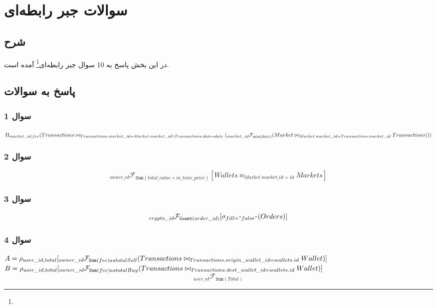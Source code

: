 \documentclass{book}
\begin{document}
        \chapter{سوالات جبر رابطه‌ای}
        \section{شرح}
        در این بخش پاسخ به 10 سوال جبر رابطه‌ای\footnote{} آمده است.
        \section{پاسخ به سوالات}
        \subsection{سوال 1}

        $\Pi_{market\_id, fee}(Transactions \\ \bowtie_{Transactions.market\_id = Market.market\_id \land Transactions.date = date}(\\
        _{market\_id}\mathcal{F}_{\min (date)} (\\
        Market \bowtie_{Market.market\_id = Transactions.market\_id} Transactions)))$

        \subsection{سوال 2}
        $$_{owner\_id}\mathcal{F}_{\mathtt{Sum}(total\_value \times in\_time\_price)} [ Wallets \bowtie_{Market.market\_id = id} Markets]$$

        \subsection{سوال 3}
        $$_{crypto\_id} \mathcal{F}_{\mathtt{Count}(order\_id)} [\sigma_{fill = "false"} (Orders)]$$

        \subsection{سوال 4}

        $A = \rho_{user\_id, total}[ _{owner\_id} \mathcal{F}_{\mathtt{Sum}(fee) as totalSell} \newline( 
            Transactions \bowtie_{Transactions.origin\_wallet\_id = wallets.id} Wallet
        )]$\\
        $B = \rho_{user\_id, total}[ _{owner\_id} \mathcal{F}_{\mathtt{Sum}(fee) as totalBuy} \newline( 
            Transactions \bowtie_{Transactions.dest\_wallet\_id = wallets.id} Wallet
        )]$
        $$_{user\_id}\mathcal{F}_{\mathtt{Sum}(Total)}$$
\end{document}
